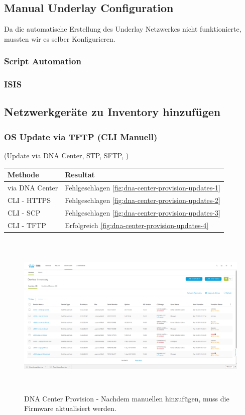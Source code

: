 \subsection{Manual Underlay Configuration}
Da die automatische Erstellung des Underlay Netzwerkes nicht funktionierte, mussten wir es selber Konfigurieren. 



\subsubsection{Script Automation}

\subsubsection{ISIS}

\subsection{Netzwerkgeräte zu Inventory hinzufügen}

\subsubsection{OS Update via TFTP (CLI Manuell)}
(Update via DNA Center, STP, SFTP, )

\begin{tabular}{ | l | l |}
	\hline
	\textbf{Methode} & \textbf{Resultat} \\
	\hline	
	via DNA Center & Fehlgeschlagen \ref{fig:dna-center-provision-updates-1} \\
	CLI - HTTPS    & Fehlgeschlagen \ref{fig:dna-center-provision-updates-2} \\
	CLI - SCP      & Fehlgeschlagen \ref{fig:dna-center-provision-updates-3} \\
	CLI - TFTP     & Erfolgreich \ref{fig:dna-center-provision-updates-4} \\	
	\hline	
\end{tabular}

\begin{figure}[H]
	\centering
	\includegraphics[height=8cm]{img/updates/Selection_070.png}
	\caption{DNA Center Provision - Nachdem manuellen hinzufügen, muss die Firmware aktualisiert werden.}
	\label{fig:dna-center-provision-updates}
\end{figure}


